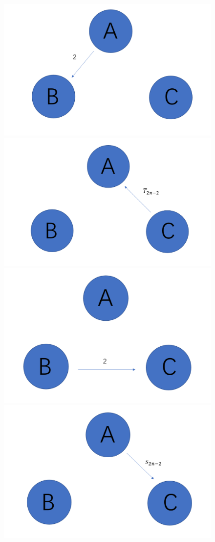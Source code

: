 \documentclass[]{article}
\begin{document}
\begin{enumerate}
\begin{figure}[H]
	\includegraphics[scale=0.4]{P2}
	\includegraphics[scale=0.4]{P3}
	\includegraphics[scale=0.4]{P4}
	\includegraphics[scale=0.4]{P5}

\end{figure}
\end{enumerate}
\end{document}

